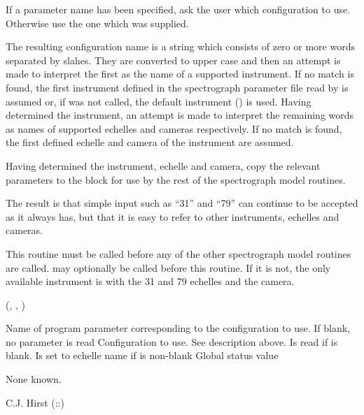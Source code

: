 \begin{manroutinedescription}
     If a parameter name has been specified, ask the user which configuration
     to use. Otherwise use the one which was supplied.

     The resulting configuration name is a string which consists of zero or
     more words separated by slahes. They are converted to upper case and
     then an attempt is made to interpret the first as the name of a supported
     instrument. If no match is found, the first instrument defined in the
     spectrograph parameter file read by {} is assumed or, if %
{}
     was not called, the default instrument ({}) is used. Having %
determined
     the instrument, an attempt is made to interpret the remaining words as
     names of supported echelles and cameras respectively. If no match is
     found, the first defined echelle and camera of the instrument are assumed.

     Having determined the instrument, echelle and camera, copy the relevant
     parameters to the {} {} block for use by %
the rest of the
     spectrograph model routines.

     The result is that simple input such as ``31'' and ``79'' can continue to
     be accepted as it always has, but that it is easy to refer to other
     instruments, echelles and cameras.

     This routine must be called before any of the other spectrograph model
     routines are called. {} may optionally be called before %
this
     routine. If it is not, the only available instrument is {} %
with the
     31 and 79 echelles and the {} camera.

     {} {} ({}, {}, {%
})

\begin{manparametertable}
Name of program parameter
                                         corresponding to the configuration
                                         to use. If blank, no parameter is read
 Configuration to use. See description
                                         above. Is read if {} is %
blank. Is
                                         set to echelle name if {}
                                         is non-blank
 Global status value
\end{manparametertable}
     None known.

     C.J. Hirst  {}  ({}::{})

\end{manroutinedescription}
